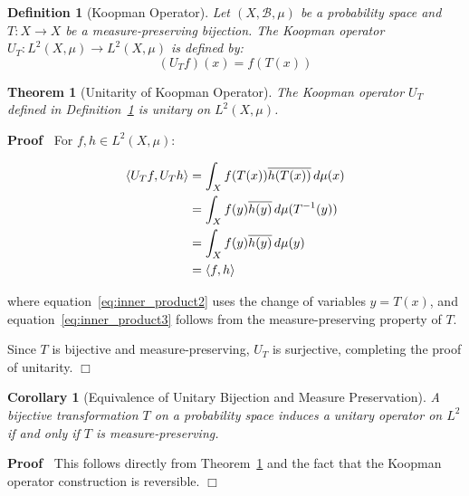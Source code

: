 \documentclass{article}
\newenvironment{proof}{\noindent\textbf{Proof\ }}{\hspace*{\fill}$\Box$\medskip}
\newtheorem{corollary}{Corollary}
\newtheorem{definition}{Definition}
\newtheorem{theorem}{Theorem}
\begin{document}
\begin{definition}
  [Koopman Operator]\label{def:koopman}Let $(X, \mathcal{B}, \mu)$ be a
  probability space and $T : X \to X$ be a measure-preserving bijection. The
  Koopman operator $U_T : L^2 (X, \mu) \to L^2 (X, \mu)$ is defined by:
  \begin{equation}
    \label{eq:koopman} (U_T f) (x) = f (T (x))
  \end{equation}
\end{definition}

\begin{theorem}
  [Unitarity of Koopman Operator]\label{thm:koopman_unitary}The Koopman
  operator $U_T$ defined in Definition~\ref{def:koopman} is unitary on $L^2
  (X, \mu)$.
\end{theorem}

\begin{proof}
  For $f, h \in L^2 (X, \mu)$:
  
  \begin{align}
    \langle U_T f, U_T h \rangle & = \int_X f (T (x)) \overline{h (T (x))}
    \hspace{0.17em} d \mu (x)  \label{eq:inner_product1}\\
    & = \int_X f (y) \overline{h (y)} \hspace{0.17em} d \mu (T^{- 1} (y)) 
    \label{eq:inner_product2}\\
    & = \int_X f (y) \overline{h (y)} \hspace{0.17em} d \mu (y) 
    \label{eq:inner_product3}\\
    & = \langle f, h \rangle  \label{eq:inner_product4}
  \end{align}
  
  where equation~\eqref{eq:inner_product2} uses the change of variables $y = T
  (x)$, and equation~\eqref{eq:inner_product3} follows from the
  measure-preserving property of $T$.
  
  Since $T$ is bijective and measure-preserving, $U_T$ is surjective,
  completing the proof of unitarity.
\end{proof}

\begin{corollary}
  [Equivalence of Unitary Bijection and Measure
  Preservation]\label{cor:unitary_equiv}A bijective transformation $T$ on a
  probability space induces a unitary operator on $L^2$ if and only if $T$ is
  measure-preserving.
\end{corollary}

\begin{proof}
  This follows directly from Theorem~\ref{thm:koopman_unitary} and the fact
  that the Koopman operator construction is reversible.
\end{proof}
\end{document}
